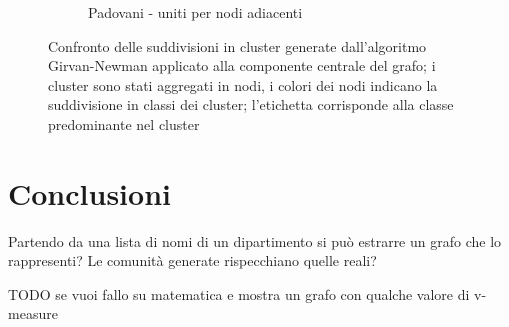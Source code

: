 \documentclass[12pt,a4paper,twoside]{report}
\begin{document}
\begin{figure}[ht]
\begin{subfigure}[b]{0.5\textwidth}
                \caption{Padovani - uniti per nodi adiacenti}
        \end{subfigure}%
    \caption{Confronto delle suddivisioni in cluster generate dall'algoritmo Girvan-Newman applicato
    alla componente centrale del grafo; i cluster sono stati aggregati in nodi, i colori dei nodi
    indicano la suddivisione in classi dei cluster; l'etichetta corrisponde alla classe
    predominante nel cluster}
    \label{fig:grafigirvanaggregati}
\end{figure}





\whitePage
\chapter{Conclusioni} \label{cap:conclusioni}

Partendo da una lista di nomi di un dipartimento si può estrarre un grafo che lo rappresenti? Le
comunità generate rispecchiano quelle reali?

TODO se vuoi fallo su matematica e mostra un grafo con qualche valore di v-measure






\end{document}
